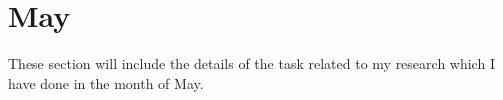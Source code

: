 \chapter{May}
\label{chap:Mar}


These section will include the details of the task related to my research which I have done in the month of May.





